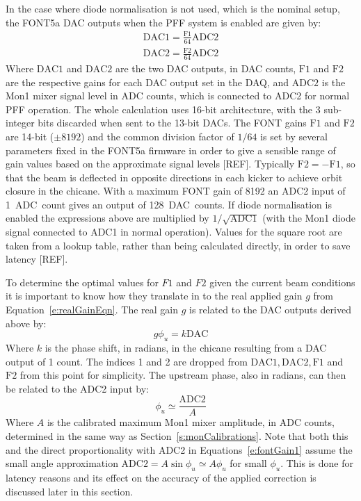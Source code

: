 In the case where diode normalisation is not used, which is the nominal setup, the FONT5a DAC outputs when the PFF system is enabled are given by:
\begin{eqnarray}
\mathrm{DAC1} = \frac{\mathrm{F1}}{64}\mathrm{ADC2} \nonumber \\ 
\mathrm{DAC2} = \frac{\mathrm{F2}}{64}\mathrm{ADC2} \label{e:fontGain1}
\end{eqnarray}
Where \(\mathrm{DAC1}\) and \(\mathrm{DAC2}\) are the two DAC outputs, in DAC counts, \(\mathrm{F1}\) and \(\mathrm{F2}\) are the respective gains for each DAC output set in the DAQ, and \(\mathrm{ADC2}\) is the Mon1 mixer signal level in ADC counts, which is connected to ADC2 for normal PFF operation. The whole calculation uses 16-bit architecture, with the 3 sub-integer bits discarded when sent to the 13-bit DACs. The FONT gains \(\mathrm{F1}\) and \(\mathrm{F2}\) are 14-bit (\(\pm8192\)) and the common division factor of \(1/64\) is set by several parameters fixed in the FONT5a firmware in order to give a sensible range of gain values based on the approximate signal levels [REF]. Typically \(\mathrm{F2} = -\mathrm{F1}\), so that the beam is deflected in opposite directions in each kicker to achieve orbit closure in the chicane. With a maximum FONT gain of 8192 an ADC2 input of 1~ADC~count gives an output of 128~DAC~counts. If diode normalisation is enabled the expressions above are multiplied by \(1/\sqrt{\mathrm{ADC1}}\) (with the Mon1 diode signal connected to ADC1 in normal operation). Values for the square root are taken from a lookup table, rather than being calculated directly, in order to save latency [REF].

To determine the optimal values for \(F1\) and \(F2\) given the current beam conditions it is important to know how they translate in to the real applied gain \(g\) from Equation~\ref{e:realGainEqn}. The real gain \(g\) is related to the DAC outputs derived above by:
\begin{equation} \label{e:fontGain2}
g\phi_u = k\mathrm{DAC}
\end{equation}
Where \(k\) is the phase shift, in radians, in the chicane resulting from a DAC output of 1 count. The indices 1 and 2 are dropped from \(\mathrm{DAC1, DAC2, F1}\) and \(\mathrm{F2}\) from this point for simplicity. The upstream phase, also in radians, can then be related to the ADC2 input by:
\begin{equation} \label{e:fontGain3}
\phi_u \simeq \frac{\mathrm{ADC2}}{A}
\end{equation}
Where \(A\) is the calibrated maximum Mon1 mixer amplitude, in ADC counts, determined in the same way as Section~\ref{s:monCalibrations}. Note that both this and the direct proportionality with ADC2 in Equations~\ref{e:fontGain1} assume the small angle approximation \(\mathrm{ADC2} = A\sin\phi_u \simeq A\phi_u\) for small \(\phi_u\). This is done for latency reasons and its effect on the accuracy of the applied correction is discussed later in this section.

